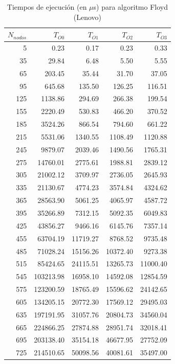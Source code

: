 \documentclass{homework}
\begin{document}
    \begin{table}[h]
        \centering
        \begin{tabular}{|r|r|r|r|r|}
            \hline
            $N_{nodos}$ & $T_{O0}$ & $T_{O1}$ & $T_{O2}$ & $T_{O3}$ \\
            \hline
            5 & 0.23 & 0.17 & 0.23 & 0.33 \\ 
            35 & 29.84 & 6.48 & 5.50 & 5.55 \\ 
            65 & 203.45 & 35.44 & 31.70 & 37.05 \\ 
            95 & 645.68 & 135.50 & 126.25 & 116.51 \\ 
            125 & 1138.86 & 294.69 & 266.38 & 199.54 \\ 
            155 & 2220.49 & 530.83 & 466.20 & 370.52 \\ 
            185 & 3524.26 & 866.54 & 794.60 & 661.22 \\ 
            215 & 5531.06 & 1340.55 & 1108.49 & 1120.88 \\ 
            245 & 9879.07 & 2039.46 & 1490.56 & 1765.31 \\ 
            275 & 14760.01 & 2775.61 & 1988.81 & 2839.12 \\ 
            305 & 21002.12 & 3709.97 & 2736.05 & 2645.93 \\ 
            335 & 21130.67 & 4774.23 & 3574.84 & 4324.62 \\ 
            365 & 28563.90 & 5061.25 & 4065.97 & 4587.72 \\ 
            395 & 35266.89 & 7312.15 & 5092.35 & 6049.83 \\ 
            425 & 43856.27 & 9466.16 & 6145.76 & 7357.14 \\ 
            455 & 63704.19 & 11719.27 & 8768.52 & 9735.48 \\ 
            485 & 71028.24 & 15156.26 & 10372.40 & 9273.38 \\ 
            515 & 85424.65 & 24115.51 & 13265.73 & 11000.40 \\ 
            545 & 103213.98 & 16958.10 & 14592.08 & 12854.59 \\ 
            575 & 123200.59 & 18765.49 & 15596.62 & 24142.65 \\ 
            605 & 134205.15 & 20772.30 & 17569.12 & 29495.03 \\ 
            635 & 197191.95 & 31057.76 & 20804.73 & 34560.04 \\ 
            665 & 224866.25 & 27874.88 & 28951.74 & 32018.41 \\ 
            695 & 203138.40 & 35154.18 & 46677.95 & 27752.09 \\ 
            725 & 214510.65 & 50098.56 & 40081.61 & 35497.00 \\ 
            \hline
        \end{tabular}
        \caption{Tiempos de ejecución (en $\mu$s) para algoritmo Floyd (Lenovo)}
    \end{table}
\end{document}
